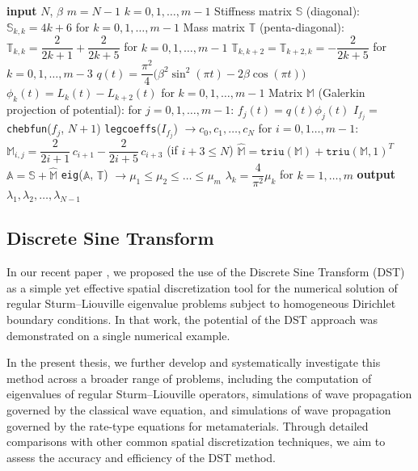 \documentclass[11pt,a4paper,oneside,openright]{report} %
\begin{document}
\begin{algorithm}[H]
\caption{Legendre--Galerkin--Chebyshev Collocation - Coffey--Evans equation}
\label{alg_LGCC_CE}
{\small
\begin{algorithmic}[1]
\State \textbf{input} $N$, $\beta$
\State $m = N - 1$
\State $k = 0,1,\dots,m-1$
\BlankLine
\State Stiffness matrix $\mathbb{S}$ (diagonal):
\State \quad $\mathbb{S}_{k,k} = 4 k + 6$  \quad for $k = 0,1, \dots, m-1$
\BlankLine
\State Mass matrix $\mathbb{T}$ (penta-diagonal):
\State \quad $\mathbb{T}_{k,k} = \dfrac{2}{2k+1} + \dfrac{2}{2k+5}$ \quad for $k = 0,1, \dots, m-1$
\State \quad $\mathbb{T}_{k,k+2} = \mathbb{T}_{k+2,k} = -\dfrac{2}{2 k+5}$ \quad for $k = 0,1, \dots, m-3$
\BlankLine
\State $q(t) = \dfrac{\pi^2}{4} \big(\beta^2 \sin^2(\pi t) - 2 \beta \cos(\pi t) \big)$
\State $\phi_k(t) = L_{k}(t) - L_{k+2}(t)$ \quad for $k = 0,1, \dots, m-1$
\BlankLine
\State Matrix $\mathbb{M}$ (Galerkin projection of potential):
\State \quad for $j = 0,1, \dots, m-1$:
\State \quad \quad $f_j(t) = q(t) \phi_j(t)$
\State \quad \quad $I_{f_j} =$ \texttt{chebfun}($f_j$, $N+1$) 
\State \quad \quad \texttt{legcoeffs}($I_{f_j}$) $ \to c_0, c_1, \dots, c_N$
\State \quad \quad for $i = 0,1 \dots, m-1$:
\State \quad \quad \quad $\mathbb{M}_{i,j} = \dfrac{2}{2 i+1} \, c_{i+1} - \dfrac{2}{2 i+5} \, c_{i+3}$ \quad (if $i+3 \leq N$)
\BlankLine
\State $\mathbb{\hat{M}} = \texttt{triu}(\mathbb{M}) + \texttt{triu}(\mathbb{M},1)^T$
\State $\mathbb{A} = \mathbb{S} + \mathbb{\hat{M}}$
\BlankLine
\State \texttt{eig}($\mathbb{A}$, $\mathbb{T}$) $ \to \mu_1 \leq \mu_2 \leq \dots \leq \mu_m $
\State$\lambda_k = \dfrac{4}{\pi^2} \mu_k$ \quad for $k = 1, \dots, m$
\State \textbf{output} $\lambda_1, \lambda_2, \dots, \lambda_{N-1}$
\end{algorithmic}
}
\end{algorithm}


\subsection{Discrete Sine Transform}
\noindent
In our recent paper \cite{fusi}, we proposed the use of the Discrete Sine Transform (DST) as a simple yet effective spatial discretization tool for the numerical solution of regular Sturm--Liouville eigenvalue problems subject to homogeneous Dirichlet boundary conditions. In that work, the potential of the DST approach was demonstrated on a single numerical example.

In the present thesis, we further develop and systematically investigate this method across a broader range of problems, including the computation of eigenvalues of regular Sturm--Liouville operators, simulations of wave propagation governed by the classical wave equation, and simulations of wave propagation governed by the rate-type equations for metamaterials. Through detailed comparisons with other common spatial discretization techniques, we aim to assess the accuracy and efficiency of the DST method.
\end{document}
